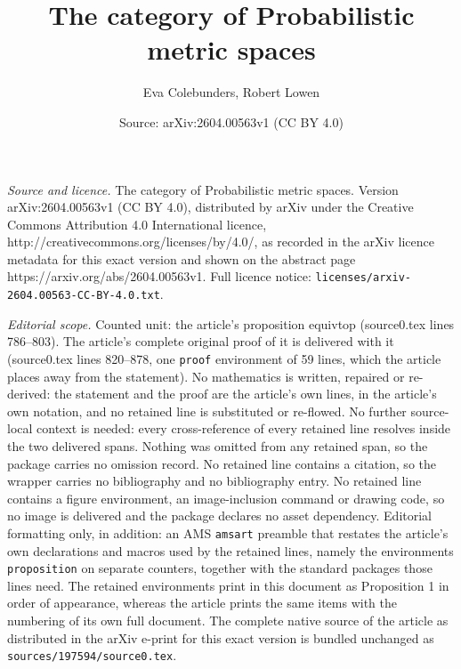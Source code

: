 \documentclass[10pt,a4paper]{amsart}
\title{The category of Probabilistic metric spaces}
\author{Eva Colebunders, Robert Lowen}
\date{Source: arXiv:2604.00563v1 (CC BY 4.0)}
\begin{document}
\maketitle

\noindent\emph{Source and licence.} The category of Probabilistic metric spaces. Version arXiv:2604.00563v1 (CC BY 4.0), distributed by arXiv under the Creative Commons Attribution 4.0 International licence, http://creativecommons.org/licenses/by/4.0/, as recorded in the arXiv licence metadata for this exact version and shown on the abstract page https://arxiv.org/abs/2604.00563v1. Full licence notice: \texttt{licenses/arxiv-2604.00563-CC-BY-4.0.txt}.\par\smallskip

\noindent\textit{Editorial scope.} Counted unit: the article's proposition equivtop (source0.tex lines 786--803). The article's complete original proof of it is delivered with it (source0.tex lines 820--878, one \texttt{proof} environment of 59 lines, which the article places away from the statement). No mathematics is written, repaired or re-derived: the statement and the proof are the article's own lines, in the article's own notation, and no retained line is substituted or re-flowed.  No further source-local context is needed: every cross-reference of every retained line resolves inside the two delivered spans.  Nothing was omitted from any retained span, so the package carries no omission record.  No retained line contains a citation, so the wrapper carries no bibliography and no bibliography entry.  No retained line contains a figure environment, an image-inclusion command or drawing code, so no image is delivered and the package declares no asset dependency.  Editorial formatting only, in addition: an AMS \texttt{amsart} preamble that restates the article's own declarations and macros used by the retained lines, namely the environments \texttt{proposition} on separate counters, together with the standard packages those lines need.  The retained environments print in this document as Proposition 1 in order of appearance, whereas the article prints the same items with the numbering of its own full document.  The complete native source of the article as distributed in the arXiv e-print for this exact version is bundled unchanged as \texttt{sources/197594/source0.tex}.
\end{document}
